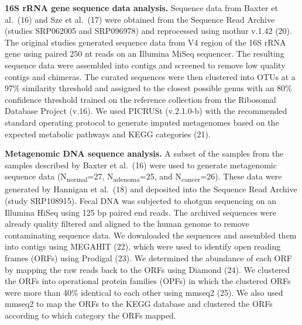 \documentclass[11pt,]{article}
\begin{document}
\textbf{16S rRNA gene sequence data analysis.} Sequence data from Baxter
et al.~(16) and Sze et al.~(17) were obtained from the Sequence Read
Archive (studies SRP062005 and SRP096978) and reprocessed using mothur
v.1.42 (20). The original studies generated sequence data from V4 region
of the 16S rRNA gene using paired 250 nt reads on an Illumina MiSeq
sequencer. The resulting sequence data were assembled into contigs and
screened to remove low quality contigs and chimeras. The curated
sequences were then clustered into OTUs at a 97\% similarity threshold
and assigned to the closest possible genus with an 80\% confidence
threshold trained on the reference collection from the Ribosomal
Database Project (v.16). We used PICRUSt (v.2.1.0-b) with the
recommended standard operating protocol to generate imputed metagenomes
based on the expected metabolic pathways and KEGG categories (21).

\textbf{Metagenomic DNA sequence analysis.} A subset of the samples from
the samples described by Baxter et al.~(16) were used to generate
metagenomic sequence data (N\textsubscript{normal}=27,
N\textsubscript{adenoma}=25, and N\textsubscript{cancer}=26). These data
were generated by Hannigan et al.~(18) and deposited into the Sequence
Read Archive (study SRP108915). Fecal DNA was subjected to shotgun
sequencing on an Illumina HiSeq using 125 bp paired end reads. The
archived sequences were already quality filtered and aligned to the
human genome to remove contaminating sequence data. We downloaded the
sequences and assembled them into contigs using MEGAHIT (22), which were
used to identify open reading frames (ORFs) using Prodigal (23). We
determined the abundance of each ORF by mapping the raw reads back to
the ORFs using Diamond (24). We clustered the ORFs into operational
protein families (OPFs) in which the clustered ORFs were more than 40\%
identical to each other using mmseq2 (25). We also used mmseq2 to map
the ORFs to the KEGG database and clustered the ORFs according to which
category the ORFs mapped.
\end{document}
